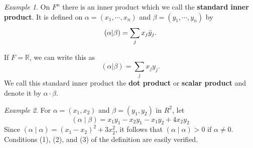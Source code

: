 \documentclass{book}
\theoremstyle{remark}
\newtheorem{example}{Example}[section]
\theoremstyle{definition}
\begin{document}
\begin{example}
On $F^n$ there is an inner product which we call the \textbf{standard inner product}. It is defined on $\alpha = (x_1, \cdots, x_n)$ and $\beta = (y_1, \cdots, y_n)$ by 
\begin{equation}
    (\alpha |\beta ) = \sum_j x_j \Bar{y}_j.
\end{equation}

If $F = \mathbb{R}$, we can write this as 
\begin{equation}
    (\alpha |\beta ) = \sum_j x_j y_j. 
\end{equation}
We call this standard inner product the \textbf{dot product} or \textbf{scalar product} and denote it by $\alpha \cdot \beta$. 
\end{example}

\begin{example}
    For $\alpha=\left(x_1, x_2\right)$ and $\beta=\left(y_1, y_2\right)$ in $R^2$, let
    $$
    (\alpha \mid \beta)=x_1 y_1-x_2 y_1-x_1 y_2+4 x_2 y_2
    $$
    Since $(\alpha \mid \alpha)=\left(x_1-x_2\right)^2+3 x_2^2$, it follows that $(\alpha \mid \alpha)>0$ if $\alpha \neq 0$. Conditions (1), (2), and (3) of the definition are easily verified.
\end{example}
\end{document}
